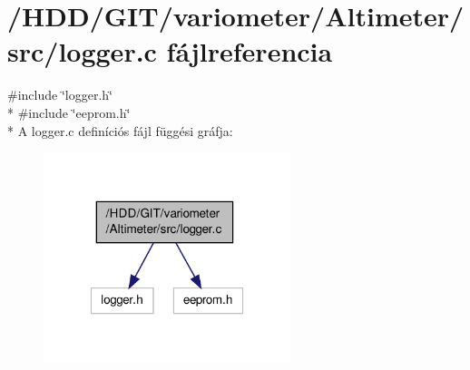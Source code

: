 \section{/\-H\-D\-D/\-G\-I\-T/variometer/\-Altimeter/src/logger.c fájlreferencia}
\label{logger_8c}
{\ttfamily \#include \char`\"{}logger.\-h\char`\"{}}\\*
{\ttfamily \#include \char`\"{}eeprom.\-h\char`\"{}}\\*
A logger.\-c definíciós fájl függési gráfja\-:
\nopagebreak
\begin{figure}[H]
\begin{center}
\leavevmode
\includegraphics[width=204pt]{logger_8c__incl}
\end{center}
\end{figure}
